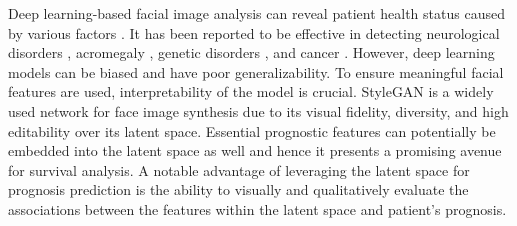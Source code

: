 \documentclass[runningheads]{llncs}
\begin{document}
Deep learning-based facial image analysis can reveal patient health status caused by various factors \cite{su2021deep}. It has been reported to be effective in detecting neurological disorders \cite{yolcu2017deep}, acromegaly \cite{kong2018automatic}, genetic disorders \cite{gurovich2019identifying}, and cancer \cite{liang2020identification}.
  However, deep learning models can be biased \cite{wallis2022clever} and have poor generalizability. 
  To ensure meaningful facial features are used, interpretability of the model is crucial. StyleGAN \cite{karras2020training,karras2020analyzing} is a widely used network for face image synthesis due to its visual fidelity, diversity, and high editability over its latent space. 
  Essential prognostic features can potentially be embedded into the latent space as well and hence it presents a promising avenue for survival analysis. A notable advantage of leveraging the latent space for prognosis prediction is the ability to visually and qualitatively evaluate the associations between the features within the latent space and patient's prognosis.
\end{document}

